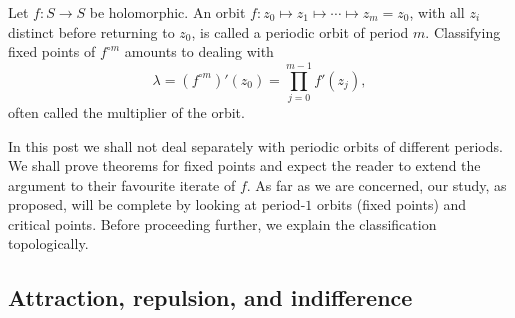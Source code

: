 \documentclass[11pt,a4paper]{article}
\begin{document}
\setcounter{definition}{3}\begin{definition}
Let $f\colon S\to S$ be holomorphic. An orbit
$f\colon z_0\mapsto z_1\mapsto\cdots\mapsto z_m=z_0$,
with all $z_i$ distinct before returning to $z_0$, is called a periodic orbit of period $m$. Classifying fixed points of $f^{\circ m}$ amounts to dealing with
\[
\lambda=(f^{\circ m})'(z_0)=\prod_{j=0}^{m-1}f'(z_j),
\]
often called the multiplier of the orbit.
\end{definition}
In this post we shall not deal separately with periodic orbits of different periods. We shall prove theorems for fixed points and expect the reader to extend the argument to their favourite iterate of $f$. As far as we are concerned, our study, as proposed, will be complete by looking at period-$1$ orbits (fixed points) and critical points. Before proceeding further, we explain the classification topologically.
\subsection{Attraction, repulsion, and indifference}
\end{document}
